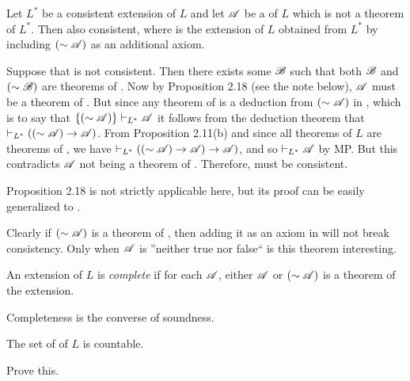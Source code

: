 \begin{proposition}
  Let \(L^{\ast}\) be a consistent extension of \(L\) and let \(\mathscr{A}\) be a \wf{} of \(L\) which is not a theorem of \(L^{\ast}\). Then \Lextext{} also consistent, where \Lextext{} is the extension of \(L\) obtained from \(L^{\ast}\) by including \((\sim\mathscr{A})\) as an additional axiom.

  \prf{} Suppose that \Lextext{} is not consistent. Then there exists some \wf{} \(\mathscr{B}\) such that both \(\mathscr{B}\) and \((\sim\mathscr{B})\) are theorems of \Lextext{}. Now by Proposition 2.18 (see the note below), \(\mathscr{A}\) must be a theorem of \Lextext{}. But since any theorem of \Lextext{} is a deduction from \((\sim\mathscr{A})\) in \Lext{}, which is to say that \(\{(\sim\mathscr{A})\} \vdash_{L^{\ast}} \mathscr{A}\) it follows from the deduction theorem that \(\vdash_{L^{\ast}} ((\sim\mathscr{A}) \rightarrow \mathscr{A})\). From Proposition 2.11(b) and since all theorems of \(L\) are theorems of \Lext{}, we have \(\vdash_{L^{\ast}} ((\sim\mathscr{A}) \rightarrow \mathscr{A}) \rightarrow \mathscr{A})\), and so \(\vdash_{L^{\ast}} \mathscr{A}\) by MP. But this contradicts \(\mathscr{A}\) not being a theorem of \Lext{}. Therefore, \Lextext{} must be consistent.

  \note{} Proposition 2.18 is not strictly applicable here, but its proof can be easily generalized to \Lextext{}.

  \note{} Clearly if \((\sim\mathscr{A})\) is a theorem of \Lext{}, then adding it as an axiom in \Lextext{} will not break consistency. Only when \(\mathscr{A}\) is ''neither true nor false`` is this theorem interesting.
\end{proposition}

\begin{definition}
  An extension of \(L\) is \textit{complete} if for each \wf{} \(\mathscr{A}\), either \(\mathscr{A}\) or \((\sim\mathscr{A})\) is a theorem of the extension.
  
  \note{} Completeness is the converse of soundness.
\end{definition}


\begin{proposition*}
  The set of \wfs{} of \(L\) is countable.  

  \prf{} Prove this.
\end{proposition*}

